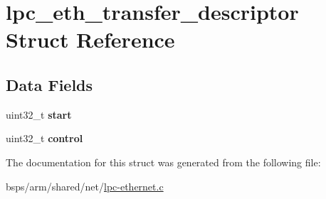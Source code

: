 \hypertarget{structlpc__eth__transfer__descriptor}{}\section{lpc\+\_\+eth\+\_\+transfer\+\_\+descriptor Struct Reference}
\label{structlpc__eth__transfer__descriptor}
\subsection*{Data Fields}
\begin{DoxyCompactItemize}
\item 
\mbox{\label{structlpc__eth__transfer__descriptor_accf8f0ba2bb11b3f3a7dadccb9e25fd4}} 
uint32\+\_\+t {\bfseries start}
\item 
\mbox{\label{structlpc__eth__transfer__descriptor_a16af639344d51df62fc2c81741c7d67d}} 
uint32\+\_\+t {\bfseries control}
\end{DoxyCompactItemize}


The documentation for this struct was generated from the following file\+:\begin{DoxyCompactItemize}
\item 
bsps/arm/shared/net/\mbox{\hyperlink{lpc-ethernet_8c}{lpc-\/ethernet.\+c}}\end{DoxyCompactItemize}
